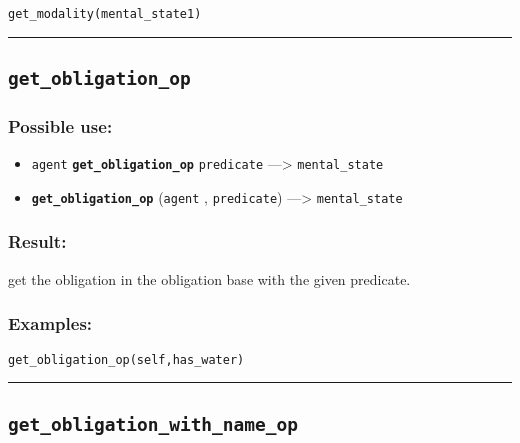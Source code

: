 \documentclass[]{book}
\providecommand{\tightlist}{%
  \setlength{\itemsep}{0pt}\setlength{\parskip}{0pt}}
\theoremstyle{definition}
\theoremstyle{definition}
\theoremstyle{definition}
\theoremstyle{remark}
\begin{document}
\begin{verbatim}
get_modality(mental_state1) 
\end{verbatim}

\begin{center}\rule{0.5\linewidth}{\linethickness}\end{center}

\subsection{\texorpdfstring{\texttt{get\_obligation\_op}}{get\_obligation\_op}}\label{get_obligation_op}

\subsubsection{Possible use:}\label{possible-use-221}

\begin{itemize}
\tightlist
\item
  \texttt{agent} \textbf{\texttt{get\_obligation\_op}}
  \texttt{predicate} ---\textgreater{} \texttt{mental\_state}
\item
  \textbf{\texttt{get\_obligation\_op}} (\texttt{agent} ,
  \texttt{predicate}) ---\textgreater{} \texttt{mental\_state}
\end{itemize}

\subsubsection{Result:}\label{result-215}

get the obligation in the obligation base with the given predicate.

\subsubsection{Examples:}\label{examples-168}

\begin{verbatim}
get_obligation_op(self,has_water) 
\end{verbatim}

\begin{center}\rule{0.5\linewidth}{\linethickness}\end{center}

\subsection{\texorpdfstring{\texttt{get\_obligation\_with\_name\_op}}{get\_obligation\_with\_name\_op}}\label{get_obligation_with_name_op}
\end{document}
